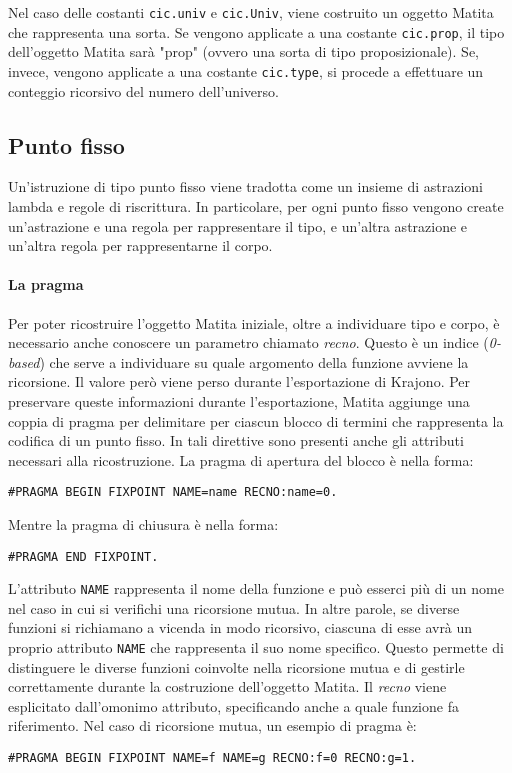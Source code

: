 \documentclass[12pt,a4paper]{mimosis}
\begin{document}
Nel caso delle costanti \texttt{cic.univ} e \texttt{cic.Univ}, viene costruito un
oggetto Matita che rappresenta una sorta. Se vengono applicate a una costante
\texttt{cic.prop}, il tipo dell'oggetto Matita sarà "prop" (ovvero una sorta di
tipo proposizionale). Se, invece, vengono applicate a una costante \texttt{cic.type},
si procede a effettuare un conteggio ricorsivo del numero dell'universo.

\subsection{Punto fisso} 
Un'istruzione di tipo punto fisso viene tradotta come un insieme di astrazioni 
lambda e regole di riscrittura. In particolare, per ogni punto fisso vengono 
create un'astrazione e una regola per rappresentare il tipo, e un'altra astrazione
e un'altra regola per rappresentarne il corpo.


\paragraph{La pragma} Per poter ricostruire l'oggetto Matita iniziale, oltre
a individuare tipo e corpo, è necessario anche conoscere un parametro chiamato
\textit{recno}. Questo è un indice (\textit{0-based}) che serve a individuare
su quale argomento della funzione avviene la ricorsione. Il valore però viene
perso durante l'esportazione di Krajono.
Per preservare queste informazioni durante l'esportazione, Matita aggiunge 
una coppia di pragma per delimitare per ciascun blocco di termini che rappresenta 
la codifica di un punto fisso. In tali direttive sono presenti anche gli attributi
necessari alla ricostruzione. La pragma di apertura del blocco è nella forma:
\begin{center}
\texttt{\#PRAGMA BEGIN FIXPOINT NAME=name RECNO:name=0.}
\end{center}
Mentre la pragma di chiusura è nella forma:
\begin{center}
\texttt{\#PRAGMA END FIXPOINT.}
\end{center}

L'attributo \texttt{NAME} rappresenta il nome della funzione e può esserci più
di un nome nel caso in cui si verifichi una ricorsione mutua. In altre parole,
se diverse funzioni si richiamano a vicenda in modo ricorsivo, ciascuna di esse
avrà un proprio attributo \texttt{NAME} che rappresenta il suo nome specifico.
Questo permette di distinguere le diverse funzioni coinvolte nella ricorsione 
mutua e di gestirle correttamente durante la costruzione dell'oggetto Matita.
Il \textit{recno} viene esplicitato dall'omonimo attributo, specificando anche
a quale funzione fa riferimento. Nel caso di ricorsione mutua, un esempio di
pragma è:
\begin{center}
\texttt{\#PRAGMA BEGIN FIXPOINT NAME=f NAME=g RECNO:f=0 RECNO:g=1.}
\end{center}
\end{document}
